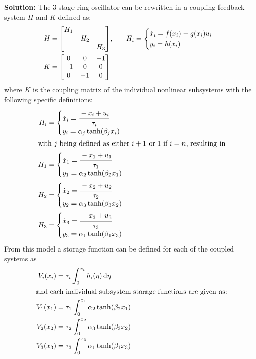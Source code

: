 \documentclass[letter]{article}
\begin{document}
\noindent
\textbf{Solution:}
The 3-stage ring oscillator can be rewritten in a coupling feedback system $H$ and $K$ defined as:
\begin{align}
	H &= \mqty[\dmat{H_1}{H_2}{H_3}], \hspace{0.25in}
	H_i
	=\begin{cases}
		\dot{x}_i = f(x_i) + g(x_i) u_i\\
		y_i = h(x_i)
	\end{cases}\\
	K &= \mqty[	 0 	& 0 &-1\\
				-1 	& 0 & 0\\
				0 	&-1 & 0]
\end{align}
where $K$ is the coupling matrix of the individual nonlinear subsystems with the following specific definitions:
\begin{align}
	H_i &=\begin{cases}
		\dot{x}_i = \cfrac{-x_i + u_i}{\tau_i}\\
		y_i = \alpha_j \tanh(\beta_j x_i)
	\end{cases}\\
	\intertext{with $j$ being defined as either $i+1$ or $1$ if $i=n$, resulting in}
	H_1 &=\begin{cases}
		\dot{x}_1 = \cfrac{-x_1 + u_1}{\tau_1}\\
		y_1 = \alpha_2 \tanh(\beta_2 x_1)
	\end{cases}\\
	H_2 &=\begin{cases}
		\dot{x}_2 = \cfrac{-x_2 + u_2}{\tau_2}\\
		y_2 = \alpha_3 \tanh(\beta_3 x_2)
	\end{cases}\\
	H_3 &=\begin{cases}
		\dot{x}_3 = \cfrac{-x_3 + u_3}{\tau_3}\\
		y_3 = \alpha_1 \tanh(\beta_1 x_3)
	\end{cases}
\end{align}
\newpage
From this model a storage function can be defined for each of the coupled systems as
\begin{align}
	V_i(x_i) &= \tau_i \int_0^{x_i} h_i(\eta) \dd{\eta}\\
	\intertext{and each individual subsystem storage functions are given as:}
	V_1(x_1) &= \tau_1 \int_0^{x_1} \alpha_2 \tanh(\beta_2 x_1)\\
	V_2(x_2) &= \tau_2 \int_0^{x_2} \alpha_3 \tanh(\beta_3 x_2)\\
	V_3(x_3) &= \tau_3 \int_0^{x_3} \alpha_1 \tanh(\beta_1 x_3)
\end{align}
\end{document}
